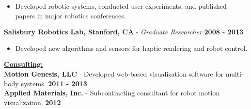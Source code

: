 \documentclass[line,margin]{res}
\newenvironment{compactlist}{
	\begin{itemize}\itemsep=0pt
}{
	\end{itemize}
}
\newcommand{\CVOnly}[1]{}
\newcommand{\CVOnly}[1]{#1}
\newcommand{\hide}[1]{}
\begin{document}
\begin{resume}
\begin{compactlist}
      \item Developed robotic systems, conducted user experiments,
        and published papers in major robotics conferences.
  \end{compactlist}
{\bf Salisbury Robotics Lab, Stanford, CA} - \emph{Graduate Researcher}
  \hfill \textbf{2008 - 2013}
  \begin{compactlist}
    \item Developed new algorithms and sensors for haptic rendering and robot control.
  \end{compactlist}
\CVOnly{
{\bf Electrical Engineering Intern} - Qual-Tron, Inc., Tulsa, OK
  \hfill \textbf{2006 - 2007}
  \begin{compactlist}
    \item Led redesign of a magnetic sensor product to reduce cost and simplify assembly.
  \end{compactlist}
}
%
\hide{
  \\[0.4pc]{\bf Summer Intern} - Atmel Corporation
    \hfill \textbf{Summer `05}
  \\[0.4pc]{\bf Summer Research Intern} - NASA Glenn Research Center
    \hfill \textbf{Summer `04}%
}
%
{\bf \underline{Consulting:}}
  {\\[0.2pc]{\bf Motion Genesis, LLC}
    - Developed web-based visualization software for multi-body systems.
      \hfill \textbf{2011 - 2013}}%
  {\\[0.0pc]{\bf Applied Materials, Inc.}
    - Subcontracting consultant for robot motion visualization.
      \hfill \textbf{2012}}%
  \CVOnly{\\[0.0pc]{\bf Charm Labs}
    - Dynamics and control. Confidential.
      \hfill \textbf{2012}}%
%
%

\end{resume}
\end{document}
